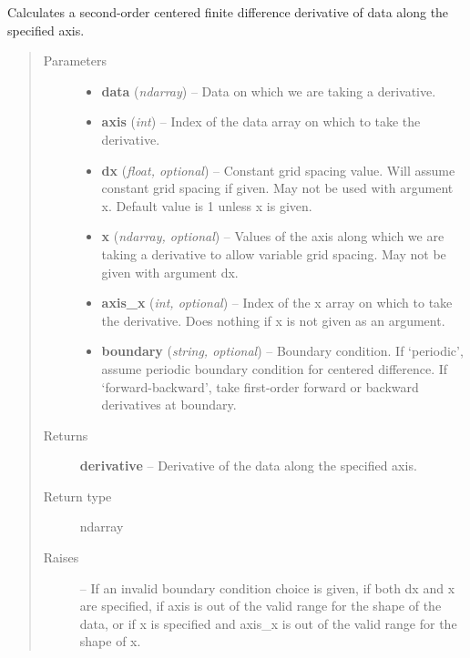 \documentclass[letterpaper,10pt,english]{sphinxmanual}
\begin{document}
\begin{fulllineitems}
\label{atmos:atmos.util.ddx}
Calculates a second-order centered finite difference derivative of data
along the specified axis.
\begin{quote}\begin{description}
\item[{Parameters}] \leavevmode\begin{itemize}
\item {} 
\textbf{data} (\emph{ndarray}) -- Data on which we are taking a derivative.

\item {} 
\textbf{axis} (\emph{int}) -- Index of the data array on which to take the derivative.

\item {} 
\textbf{dx} (\emph{float, optional}) -- Constant grid spacing value. Will assume constant grid spacing if
given. May not be used with argument x. Default value is 1 unless
x is given.

\item {} 
\textbf{x} (\emph{ndarray, optional}) -- Values of the axis along which we are taking a derivative to allow
variable grid spacing. May not be given with argument dx.

\item {} 
\textbf{axis\_x} (\emph{int, optional}) -- Index of the x array on which to take the derivative. Does nothing if
x is not given as an argument.

\item {} 
\textbf{boundary} (\emph{string, optional}) -- Boundary condition. If `periodic', assume periodic boundary condition
for centered difference. If `forward-backward', take first-order
forward or backward derivatives at boundary.

\end{itemize}

\item[{Returns}] \leavevmode
\textbf{derivative} --
Derivative of the data along the specified axis.

\item[{Return type}] \leavevmode
ndarray

\item[{Raises}] \leavevmode
{} --
If an invalid boundary condition choice is given, if both dx and x are
specified, if axis is out of the valid range for the shape of the data,
or if x is specified and axis\_x is out of the valid range for the shape
of x.

\end{description}\end{quote}

\end{fulllineitems}
\end{document}
